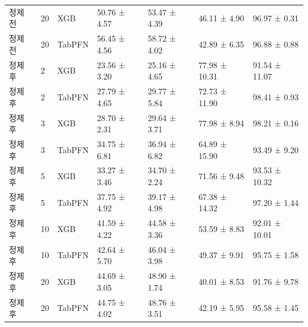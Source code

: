 \begin{longtable}
{}정제 전 & 20 & XGB & 50.76 ± 4.57 & 53.47 ± 4.39 & 46.11 ± 4.90 & 96.97 ± 0.31 \\
{}정제 전 & 20 & TabPFN & 56.45 ± 4.56 & 58.72 ± 4.02 & 42.89 ± 6.35 & 96.88 ± 0.88 \\
{}정제 후 & 2 & XGB & 23.56 ± 3.20 & 25.16 ± 4.65 & 77.98 ± 10.31 & 91.54 ± 11.07 \\
{}정제 후 & 2 & TabPFN & 27.79 ± 4.65 & 29.77 ± 5.84 & 72.73 ± 11.90 & 98.41 ± 0.93 \\
{}정제 후 & 3 & XGB & 28.70 ± 2.31 & 29.64 ± 3.71 & 77.98 ± 8.94 & 98.21 ± 0.16 \\
{}정제 후 & 3 & TabPFN & 34.75 ± 6.81 & 36.94 ± 6.82 & 64.89 ± 15.90 & 93.49 ± 9.20 \\
{}정제 후 & 5 & XGB & 33.27 ± 3.46 & 34.70 ± 2.24 & 71.56 ± 9.48 & 93.53 ± 10.32 \\
{}정제 후 & 5 & TabPFN & 37.75 ± 4.92 & 39.17 ± 4.98 & 67.38 ± 14.32 & 97.20 ± 1.44 \\
{}정제 후 & 10 & XGB & 41.59 ± 4.22 & 44.58 ± 3.36 & 53.59 ± 8.83 & 92.01 ± 10.01 \\
{}정제 후 & 10 & TabPFN & 42.64 ± 5.70 & 46.04 ± 3.98 & 49.37 ± 9.91 & 95.75 ± 1.58 \\
{}정제 후 & 20 & XGB & 44.69 ± 3.05 & 48.90 ± 1.74 & 40.01 ± 8.53 & 91.76 ± 9.78 \\
{}정제 후 & 20 & TabPFN & 44.75 ± 4.02 & 48.76 ± 3.51 & 42.19 ± 5.95 & 95.58 ± 1.45 \\
\bottomrule
\end{longtable}
\endgroup
